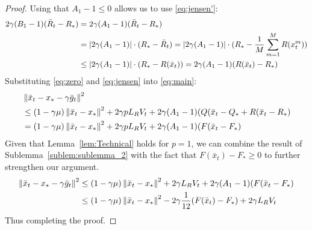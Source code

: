 \begin{proof}
    Using that $A_1 - 1 \leq 0$ allows us to use \eqref{eq:jensen'}:
    \begin{align}
        2\gamma (B_1 - 1)(\bar{R}_t - R_*) &= 2\gamma (A_1 - 1)(\bar{R}_t - R_*) \\
        &= |2\gamma (A_1 - 1)| \cdot (R_* - \bar{R}_t) = |2\gamma (A_1 - 1)| \cdot (R_* - \fsumm{m=1}{M}{R(x^m_t})) \\
        &\leq |2\gamma (A_1 - 1)| \cdot (R_* - R(\bar{x}_t)) = 2\gamma (A_1 - 1) (R(\bar{x}_t) - R_*) \label{eq:jensen}
    \end{align}
    Substituting \eqref{eq:zero} and \eqref{eq:jensen} into \eqref{eq:main}:
    \begin{align}
        &\norm{\bar{x}_t - x_* - \gamma \bar{g}_t}^2 \\
        &\leq (1 - \gamma \mu)\norm{\bar{x}_t - x_*}^2 + 2 \gamma p L_R V_t
        + 2\gamma (A_1 - 1)(Q(\bar{x}_t - Q_* + R(\bar{x}_t - R_*) \\
        &= (1 - \gamma \mu)\norm{\bar{x}_t - x_*}^2 + 2 \gamma p L_R V_t
        + 2\gamma (A_1 - 1)(F(\bar{x}_t - F_*)
    \end{align}
    Given that Lemma~\ref{lem:Technical} holds for $p = 1$, we can combine the result of Sublemma~\ref{sublem:sublemma_2} with the fact that $F(\bar{x}_t) - F_* \geq 0$ to further strengthen our argument.
    \begin{align}
        \norm{\bar{x}_t - x_* - \gamma \bar{g}_t}^2 &
        \leq (1 - \gamma \mu)\norm{\bar{x}_t - x_*}^2 + 2 \gamma L_R V_t
        + 2\gamma (A_1 - 1)(F(\bar{x}_t - F_*) \\
        &\leq (1 - \gamma \mu)\norm{\bar{x}_t - x_*}^2 - 2\gamma \frac{1}{12}(F(\bar{x}_t) - F_*) + 2 \gamma L_R V_t
    \end{align}
    Thus completing the proof.
\end{proof}

